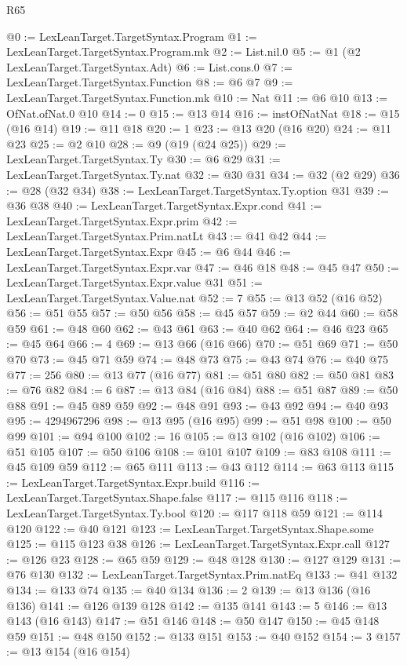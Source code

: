 \begin{lexlean}{R65}
\begin{coremodule}
@0 := LexLeanTarget.TargetSyntax.Program
@1 := LexLeanTarget.TargetSyntax.Program.mk
@2 := List.nil.{0}
@5 := @1 (@2 LexLeanTarget.TargetSyntax.Adt)
@6 := List.cons.{0}
@7 := LexLeanTarget.TargetSyntax.Function
@8 := @6 @7
@9 := LexLeanTarget.TargetSyntax.Function.mk
@10 := Nat
@11 := @6 @10
@13 := OfNat.ofNat.{0} @10
@14 := 0
@15 := @13 @14
@16 := instOfNatNat
@18 := @15 (@16 @14)
@19 := @11 @18
@20 := 1
@23 := @13 @20 (@16 @20)
@24 := @11 @23
@25 := @2 @10
@28 := @9 (@19 (@24 @25))
@29 := LexLeanTarget.TargetSyntax.Ty
@30 := @6 @29
@31 := LexLeanTarget.TargetSyntax.Ty.nat
@32 := @30 @31
@34 := @32 (@2 @29)
@36 := @28 (@32 @34)
@38 := LexLeanTarget.TargetSyntax.Ty.option @31
@39 := @36 @38
@40 := LexLeanTarget.TargetSyntax.Expr.cond
@41 := LexLeanTarget.TargetSyntax.Expr.prim
@42 := LexLeanTarget.TargetSyntax.Prim.natLt
@43 := @41 @42
@44 := LexLeanTarget.TargetSyntax.Expr
@45 := @6 @44
@46 := LexLeanTarget.TargetSyntax.Expr.var
@47 := @46 @18
@48 := @45 @47
@50 := LexLeanTarget.TargetSyntax.Expr.value @31
@51 := LexLeanTarget.TargetSyntax.Value.nat
@52 := 7
@55 := @13 @52 (@16 @52)
@56 := @51 @55
@57 := @50 @56
@58 := @45 @57
@59 := @2 @44
@60 := @58 @59
@61 := @48 @60
@62 := @43 @61
@63 := @40 @62
@64 := @46 @23
@65 := @45 @64
@66 := 4
@69 := @13 @66 (@16 @66)
@70 := @51 @69
@71 := @50 @70
@73 := @45 @71 @59
@74 := @48 @73
@75 := @43 @74
@76 := @40 @75
@77 := 256
@80 := @13 @77 (@16 @77)
@81 := @51 @80
@82 := @50 @81
@83 := @76 @82
@84 := 6
@87 := @13 @84 (@16 @84)
@88 := @51 @87
@89 := @50 @88
@91 := @45 @89 @59
@92 := @48 @91
@93 := @43 @92
@94 := @40 @93
@95 := 4294967296
@98 := @13 @95 (@16 @95)
@99 := @51 @98
@100 := @50 @99
@101 := @94 @100
@102 := 16
@105 := @13 @102 (@16 @102)
@106 := @51 @105
@107 := @50 @106
@108 := @101 @107
@109 := @83 @108
@111 := @45 @109 @59
@112 := @65 @111
@113 := @43 @112
@114 := @63 @113
@115 := LexLeanTarget.TargetSyntax.Expr.build
@116 := LexLeanTarget.TargetSyntax.Shape.false
@117 := @115 @116
@118 := LexLeanTarget.TargetSyntax.Ty.bool
@120 := @117 @118 @59
@121 := @114 @120
@122 := @40 @121
@123 := LexLeanTarget.TargetSyntax.Shape.some
@125 := @115 @123 @38
@126 := LexLeanTarget.TargetSyntax.Expr.call
@127 := @126 @23
@128 := @65 @59
@129 := @48 @128
@130 := @127 @129
@131 := @76 @130
@132 := LexLeanTarget.TargetSyntax.Prim.natEq
@133 := @41 @132
@134 := @133 @74
@135 := @40 @134
@136 := 2
@139 := @13 @136 (@16 @136)
@141 := @126 @139 @128
@142 := @135 @141
@143 := 5
@146 := @13 @143 (@16 @143)
@147 := @51 @146
@148 := @50 @147
@150 := @45 @148 @59
@151 := @48 @150
@152 := @133 @151
@153 := @40 @152
@154 := 3
@157 := @13 @154 (@16 @154)

\end{coremodule}
\end{lexlean}

